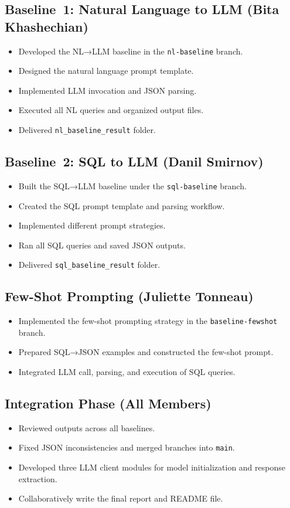 \documentclass[12pt]{article}
\begin{document}
\subsection{Baseline~1: Natural Language to LLM (Bita Khashechian)}
\begin{itemize}
    \item Developed the NL→LLM baseline in the \texttt{nl-baseline} branch.
    \item Designed the natural language prompt template.
    \item Implemented LLM invocation and JSON parsing.
    \item Executed all NL queries and organized output files.
    \item Delivered \texttt{nl\_baseline\_result} folder.
\end{itemize}

\subsection{Baseline~2: SQL to LLM (Danil Smirnov)}
\begin{itemize}
    \item Built the SQL→LLM baseline under the \texttt{sql-baseline} branch.
    \item Created the SQL prompt template and parsing workflow.
    \item Implemented different prompt strategies.
    \item Ran all SQL queries and saved JSON outputs.

    \item Delivered \texttt{sql\_baseline\_result} folder.
\end{itemize}

\subsection{Few-Shot Prompting (Juliette Tonneau)}
\begin{itemize}
    \item Implemented the few-shot prompting strategy in the \texttt{baseline-fewshot} branch.
    \item Prepared SQL→JSON examples and constructed the few-shot prompt.
    \item Integrated LLM call, parsing, and execution of SQL queries.
\end{itemize}

\subsection{Integration Phase (All Members)}
\begin{itemize}
    \item Reviewed outputs across all baselines.
    \item Fixed JSON inconsistencies and merged branches into \texttt{main}.
    \item Developed three LLM client modules for model initialization and response extraction.
    \item Collaboratively write the final report and README file.
\end{itemize}
\end{document}

